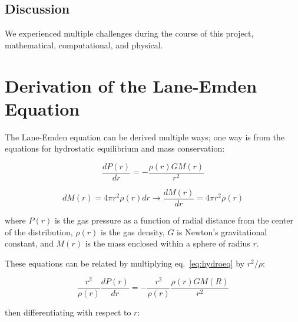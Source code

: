 \documentclass[twoside]{article}
\begin{document}
\begin{multicols}{2}

\section{Discussion}

We experienced multiple challenges during the course of this project,
mathematical, computational, and physical.

\end{multicols}



\appendix
\appendixpage
\section{Derivation of the Lane-Emden Equation\cite[pp.176--179]{leblanc2010}} 

The Lane-Emden equation can be derived multiple ways; one way is from the
equations for hydrostatic equilibrium and mass conservation:

\begin{equation}
    \label{eq:hydroeq}
    \frac{dP(r)}{dr} = -\frac{\rho(r)GM(r)}{r^2}
    \end{equation}

    \begin{equation}
    \label{eq:masscons}
    dM(r)=4\pi r^2\rho(r)dr \rightarrow \frac{dM(r)}{dr} = 4\pi r^2\rho(r)
    \end{equation}

where \(P(r)\) is the gas pressure as a function of radial distance from the
center of the distribution, \(\rho(r)\) is the gas density, \(G\) is Newton's
gravitational constant, and \(M(r)\) is the mass enclosed within a sphere of
radius \(r\).

These equations can be related by multiplying eq.~\ref{eq:hydroeq} by
\(r^2/\rho\):

\[ \frac{r^2}{\rho(r)}\frac{dP(r)}{dr} = -\frac{r^2}{\rho(r)}
\frac{\rho(r)GM(R)}{r^2} \]

then differentiating with respect to \(r\):
            
\end{document}
